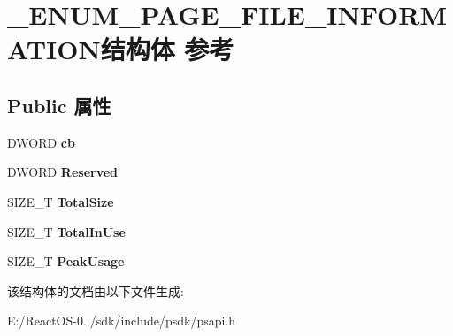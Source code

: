 \hypertarget{struct___e_n_u_m___p_a_g_e___f_i_l_e___i_n_f_o_r_m_a_t_i_o_n}{}\section{\+\_\+\+E\+N\+U\+M\+\_\+\+P\+A\+G\+E\+\_\+\+F\+I\+L\+E\+\_\+\+I\+N\+F\+O\+R\+M\+A\+T\+I\+O\+N结构体 参考}
\label{struct___e_n_u_m___p_a_g_e___f_i_l_e___i_n_f_o_r_m_a_t_i_o_n}
\subsection*{Public 属性}
\begin{DoxyCompactItemize}
\item 
\mbox{\label{struct___e_n_u_m___p_a_g_e___f_i_l_e___i_n_f_o_r_m_a_t_i_o_n_ae84bda89d6a54ce6e42a988db50f80fa}} 
D\+W\+O\+RD {\bfseries cb}
\item 
\mbox{\label{struct___e_n_u_m___p_a_g_e___f_i_l_e___i_n_f_o_r_m_a_t_i_o_n_af275276c10d23ff50ec3c8e6b8e07595}} 
D\+W\+O\+RD {\bfseries Reserved}
\item 
\mbox{\label{struct___e_n_u_m___p_a_g_e___f_i_l_e___i_n_f_o_r_m_a_t_i_o_n_a9960059e32de8b1923ca36f71240a9b0}} 
S\+I\+Z\+E\+\_\+T {\bfseries Total\+Size}
\item 
\mbox{\label{struct___e_n_u_m___p_a_g_e___f_i_l_e___i_n_f_o_r_m_a_t_i_o_n_a4702560b8a792af6448866344551abdb}} 
S\+I\+Z\+E\+\_\+T {\bfseries Total\+In\+Use}
\item 
\mbox{\label{struct___e_n_u_m___p_a_g_e___f_i_l_e___i_n_f_o_r_m_a_t_i_o_n_a51a9bcd4d688050e6767eb865e2cff7a}} 
S\+I\+Z\+E\+\_\+T {\bfseries Peak\+Usage}
\end{DoxyCompactItemize}


该结构体的文档由以下文件生成\+:\begin{DoxyCompactItemize}
\item 
E\+:/\+React\+O\+S-\/0../sdk/include/psdk/psapi.\+h\end{DoxyCompactItemize}

